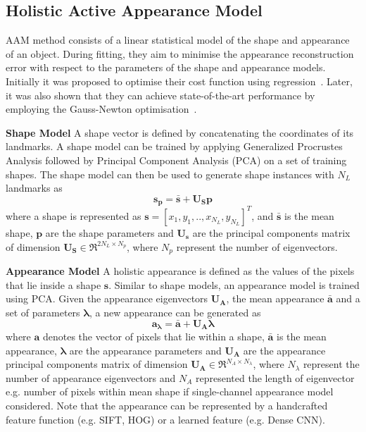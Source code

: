 \subsection{Holistic Active Appearance Model}
\label{sec:bg_aam_ear}
AAM method consists of a linear statistical model of the shape and appearance of an object. During fitting, they aim to minimise the appearance reconstruction error with respect to the parameters of the shape and appearance models. Initially it was proposed to optimise their cost function using regression~\cite{Cootes2001}. Later, it was also shown that they can achieve state-of-the-art performance by employing the Gauss-Newton optimisation~\cite{Matthews2004,antonakos2015feature}.

\noindent\textbf{Shape Model}
A shape vector is defined by concatenating the coordinates of its landmarks. A shape model can be trained by applying Generalized Procrustes Analysis followed by Principal Component Analysis (PCA) on a set of training shapes. The shape model can then be used to generate shape instances with $N_L$ landmarks as
\begin{equation} 
\label{eq:shape_model_ear}
\bm{s_p}=\bm{\bar{s}}+\bm{U_S}\bm{p}
\end{equation} 
where a shape is represented as $\bm{s}=[x_1,y_1,..,x_{N_L},y_{N_L}]^T$, and $\bm{\bar{s}}$ is the mean shape, $\bm{p}$ are the shape parameters and $\bm{U_s}$ are the principal components matrix of dimension $\bm{U_S} \in \Re^{2N_L\times N_p}$, where $N_p$ represent the number of eigenvectors.

\noindent\textbf{Appearance Model}
\label{sec:appearance_model_ear}
A holistic appearance is defined as the values of the pixels that lie inside a shape $\bm{s}$. Similar to shape models, an appearance model is trained using PCA. Given the appearance eigenvectors $\bm{U_A}$, the mean appearance $\bm{\bar{a}}$ and a set of parameters $\bm{\lambda}$, a new appearance can be generated as 
\begin{equation} 
\label{eq:appearance_model}
\bm{a_\lambda}=\bm{\bar{a}}+\bm{U_A}\bm{\lambda}
\end{equation} 
where $\bm{a}$ denotes the vector of pixels that lie within a shape,  $\bm{\bar{a}}$ is the mean appearance, $\bm{\lambda}$ are the appearance parameters and $\bm{U_A}$ are the appearance principal components matrix of dimension $\bm{U_A} \in \Re^{N_A\times N_\lambda}$, where $N_\lambda$ represent the number of appearance eigenvectors and $N_A$ represented the length of eigenvector e.g. number of pixels within mean shape if single-channel appearance model considered. Note that the appearance can be represented by a handcrafted feature function (e.g. SIFT, HOG) or a learned feature (e.g. Dense CNN).

